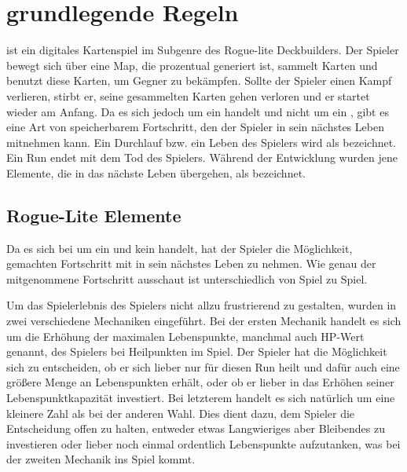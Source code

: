 
\section{grundlegende Regeln}\label{sec:grundlegenste-regeln}

\renewcommand{\kapitelautor}{Autor: Philip Jankovic}

%
\FF ist ein digitales Kartenspiel im Subgenre des Rogue-lite Deckbuilders.
Der Spieler bewegt sich über eine Map, die prozentual generiert ist, sammelt Karten und benutzt diese Karten,
um Gegner zu bekämpfen. Sollte der Spieler einen Kampf verlieren, stirbt er, seine gesammelten Karten
gehen verloren und er startet wieder am Anfang. Da es sich jedoch um ein  handelt und nicht um ein ,
gibt es eine Art von speicherbarem Fortschritt, den der Spieler in sein nächstes Leben mitnehmen kann.
Ein Durchlauf bzw. ein Leben des Spielers wird als  bezeichnet. Ein Run endet mit dem Tod des Spielers.
Während der Entwicklung wurden jene Elemente, die in das nächste Leben übergehen, als  bezeichnet.



\subsection{Rogue-Lite Elemente}\label{rogue_lite_elemente}

Da es sich bei \FF um ein  und kein  handelt, hat der Spieler die Möglichkeit, gemachten Fortschritt mit in sein nächstes Leben zu nehmen.
Wie genau der mitgenommene Fortschritt ausschaut ist unterschiedlich von Spiel zu Spiel.


Um das Spielerlebnis des Spielers nicht allzu frustrierend zu gestalten, wurden in \FF zwei verschiedene Mechaniken eingeführt.
Bei der ersten Mechanik handelt es sich um die Erhöhung der maximalen Lebenspunkte, manchmal auch HP-Wert genannt, des Spielers bei Heilpunkten im Spiel.
Der Spieler hat die Möglichkeit
sich zu entscheiden, ob er sich lieber nur für diesen Run heilt und dafür auch eine größere Menge an Lebenspunkten erhält, oder ob er
lieber in das Erhöhen seiner Lebenspunktkapazität investiert. Bei letzterem handelt es sich natürlich um eine kleinere Zahl als bei der anderen Wahl.
Dies dient dazu, dem Spieler die Entscheidung offen zu halten, entweder etwas Langwieriges aber Bleibendes zu investieren oder lieber noch einmal ordentlich
Lebenspunkte aufzutanken, was bei der zweiten Mechanik ins Spiel kommt.

